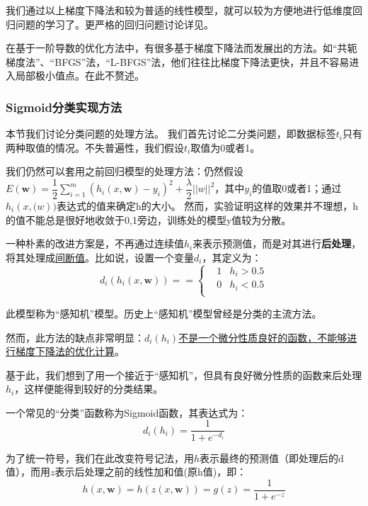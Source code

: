 我们通过以上梯度下降法和较为普适的线性模型，就可以较为方便地进行低维度回归问题的学习了。更严格的回归问题讨论详见\cite{standford_machine_learning_cs229}。

在基于一阶导数的优化方法中，有很多基于梯度下降法而发展出的方法。如“共轭梯度法”、“BFGS”法，“L-BFGS”法，他们往往比梯度下降法更快，并且不容易进入局部极小值点。在此不赘述。\cite{wikipedia_BGFS_algorithm}

\subsubsection{Sigmoid分类实现方法}
本节我们讨论分类问题的处理方法。 我们首先讨论二分类问题，即数据标签${t_i}$只有两种取值的情况。不失普遍性，我们假设${t_i}$取值为0或者1。

我们仍然可以套用之前回归模型的处理方法：仍然假设$E(\mathbf{w}) = \dfrac{1}{2} \sum^m_{i=1} (h_i(x, \mathbf{w}) - y_i )^2 + \dfrac{\lambda}{2} ||w||^2$，其中$y_i$的值取0或者1；通过$h_i(x,\mathbf(w))$表达式的值来确定h的大小。 然而，实验证明这样的效果并不理想，h的值不能总是很好地收敛于0,1旁边，训练处的模型y值较为分散。

一种朴素的改进方案是，不再通过连续值$h_i$来表示预测值，而是对其进行\textbf{后处理}，将其处理成\uline{间断值}。比如说，设置一个变量$d_i$，其定义为：
\begin{equation}
d_i(h_i(x,\mathbf{w})) == \left\{
\begin{aligned}
 & 1  & h_i > 0.5 \\
 & 0  & h_i < 0.5 \\
\end{aligned}
\right.
\end{equation}

此模型称为“感知机”模型。\cite{wikipedia_perceptron}历史上“感知机”模型曾经是分类的主流方法。 

然而，此方法的缺点非常明显：\uline{$d_i(h_i)$不是一个微分性质良好的函数，不能够进行梯度下降法的优化计算}。

基于此，我们想到了用一个接近于“感知机”，但具有良好微分性质的函数来后处理$h_i$，这样便能得到较好的分类结果。

一个常见的“分类”函数称为Sigmoid函数，其表达式为：
\begin{equation}
d_i(h_i) = \dfrac{1}{1+e^{-d_i}}
\end{equation}

为了统一符号，我们在此改变符号记法，用$h$表示最终的预测值（即处理后的d值），而用$z$表示后处理之前的线性加和值(原h值)，即：
$$ h(x,\mathbf{w}) = h(z(x,\mathbf{w})) = g(z) = \dfrac{1}{1 + e^{-z}}$$

